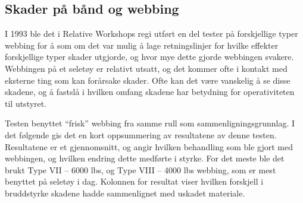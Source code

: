 \subsection{Skader på bånd og webbing}
I 1993 ble det i Relative Workshops regi utført en del tester på forskjellige typer webbing for å som om det var mulig å lage retningslinjer for hvilke effekter forskjellige typer skader utgjorde, og hvor mye dette gjorde webbingen svakere. Webbingen på et seletøy er relativt utsatt, og det kommer ofte i kontakt med eksterne ting som kan forårsake skader. Ofte kan det være vanskelig å se disse skadene, og å fastslå i hvilken omfang skadene har betydning for operativiteten til utstyret.

Testen benyttet ``frisk'' webbing fra samme rull som sammenligningsgrunnlag. I det følgende gis det en kort oppsummering av resultatene av denne testen. Resultatene er et gjennomsnitt, og angir hvilken behandling som ble gjort med webbingen, og hvilken endring dette medførte i styrke. For det meste ble det brukt Type VII – 6000 lbs, og Type VIII – 4000 lbs webbing, som er mest benyttet på seletøy i dag. Kolonnen for resultat viser hvilken forskjell i bruddstyrke skadene hadde sammenlignet med uskadet materiale.

